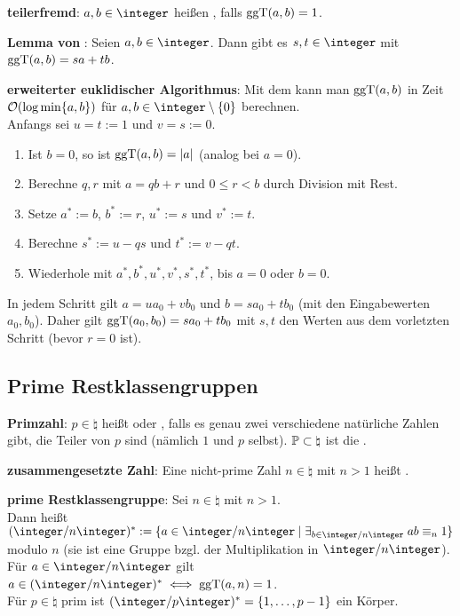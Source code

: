 \textbf{teilerfremd}:
$a, b \in \integer$ heißen , falls $\operatorname{ggT}(a, b) = 1$.

\textbf{Lemma von }:
Seien $a, b \in \integer$.
Dann gibt es $s, t \in \integer$ mit
$\operatorname{ggT}(a, b) = sa + tb$.

\textbf{erweiterter euklidischer Algorithmus}:
Mit dem  kann man $\operatorname{ggT}(a, b)$ in Zeit
$\mathcal{O}(\log \min\{a, b\})$ für $a, b \in \integer \setminus \{0\}$ berechnen.\\
Anfangs sei $u = t := 1$ und $v = s := 0$.
\begin{enumerate}
    \item
    Ist $b = 0$, so ist $\operatorname{ggT}(a, b) = |a|$ (analog bei $a = 0$).

    \item
    Berechne $q, r$ mit $a = qb + r$ und $0 \le r < b$ durch Division mit Rest.

    \item
    Setze $a^\ast := b$, $b^\ast := r$, $u^\ast := s$ und $v^\ast := t$.

    \item
    Berechne $s^\ast := u - qs$ und $t^\ast := v - qt$.

    \item
    Wiederhole mit $a^\ast, b^\ast, u^\ast, v^\ast, s^\ast, t^\ast$,
    bis $a = 0$ oder $b = 0$.
\end{enumerate}
In jedem Schritt gilt $a = ua_0 + vb_0$ und $b = sa_0 + tb_0$
(mit den Eingabewerten $a_0, b_0$).
Daher gilt $\operatorname{ggT}(a_0, b_0) = sa_0 + tb_0$ mit $s, t$ den Werten aus dem vorletzten Schritt
(bevor $r = 0$ ist).


\pagebreak

\subsection{%
    Prime Restklassengruppen%
}

\textbf{Primzahl}:
$p \in \natural$ heißt  oder , falls es genau zwei verschiedene
natürliche Zahlen gibt, die Teiler von $p$ sind (nämlich $1$ und $p$ selbst).
$\mathbb{P} \subset \natural$ ist die .

\textbf{zusammengesetzte Zahl}:
Eine nicht-prime Zahl $n \in \natural$ mit $n > 1$ heißt .

\textbf{prime Restklassengruppe}:
Sei $n \in \natural$ mit $n > 1$.\\
Dann heißt $(\ZnZ)^\ast := \{a \in \ZnZ \;|\; \exists_{b \in \ZnZ}\; ab \equiv_n 1\}$
 modulo $n$
(sie ist eine Gruppe bzgl. der Multiplikation in $\ZnZ$).\\
Für $a \in \ZnZ$ gilt $a \in (\ZnZ)^{\ast} \iff \ggT(a, n) = 1$.\\
Für $p \in \natural$ prim ist $(\ZpZ)^\ast = \{1, \dotsc, p-1\}$ ein Körper.

